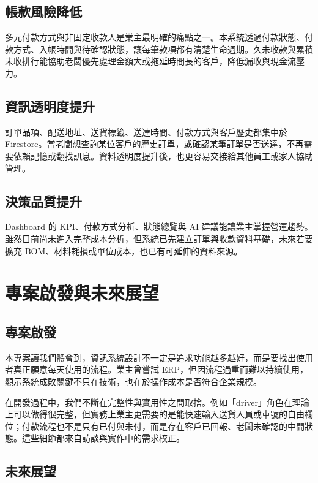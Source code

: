 \documentclass[12pt,a4paper,UTF8,fontset=none]{ctexart}
\begin{document}
\subsection{帳款風險降低}

多元付款方式與非固定收款人是業主最明確的痛點之一。本系統透過付款狀態、付款方式、入帳時間與待確認狀態，讓每筆款項都有清楚生命週期。久未收款與累積未收排行能協助老闆優先處理金額大或拖延時間長的客戶，降低漏收與現金流壓力。

\subsection{資訊透明度提升}

訂單品項、配送地址、送貨標籤、送達時間、付款方式與客戶歷史都集中於 Firestore。當老闆想查詢某位客戶的歷史訂單，或確認某筆訂單是否送達，不再需要依賴記憶或翻找訊息。資料透明度提升後，也更容易交接給其他員工或家人協助管理。

\subsection{決策品質提升}

Dashboard 的 KPI、付款方式分析、狀態總覽與 AI 建議能讓業主掌握營運趨勢。雖然目前尚未進入完整成本分析，但系統已先建立訂單與收款資料基礎，未來若要擴充 BOM、材料耗損或單位成本，也已有可延伸的資料來源。

\section{專案啟發與未來展望}

\subsection{專案啟發}

本專案讓我們體會到，資訊系統設計不一定是追求功能越多越好，而是要找出使用者真正願意每天使用的流程。業主曾嘗試 ERP，但因流程過重而難以持續使用，顯示系統成敗關鍵不只在技術，也在於操作成本是否符合企業規模。

在開發過程中，我們不斷在完整性與實用性之間取捨。例如「driver」角色在理論上可以做得很完整，但實務上業主更需要的是能快速輸入送貨人員或車號的自由欄位；付款流程也不是只有已付與未付，而是存在客戶已回報、老闆未確認的中間狀態。這些細節都來自訪談與實作中的需求校正。

\subsection{未來展望}
\end{document}
